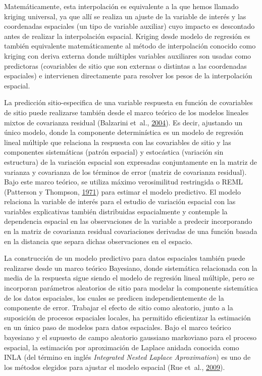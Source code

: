 \documentclass[11pt,b5paper,]{krantz}
\begin{document}
Matemáticamente, esta interpolación es equivalente a la que hemos
llamado kriging universal, ya que allí se realiza un ajuste de la
variable de interés y las coordenadas espaciales (un tipo de variable
auxiliar) cuyo impacto es descontado antes de realizar la interpolación
espacial. Kriging desde modelo de regresión es también equivalente
matemáticamente al método de interpolación conocido como kriging con
deriva externa donde múltiples variables auxiliares son usadas como
predictoras (covariables de sitio que son externas o distintas a las
coordenadas espaciales) e intervienen directamente para resolver los
pesos de la interpolación espacial.

La predicción sitio-especifica de una variable respuesta en función de
covariables de sitio puede realizarse también desde el marco teórico de
los modelos lineales mixtos de covarianza residual (Balzarini et~al.,
\protect\hyperlink{ref-Balzarini_Macchiavelli_Casanoves_2004}{2004}). Es
decir, ajustando un único modelo, donde la componente determinística es
un modelo de regresión lineal múltiple que relaciona la respuesta con
las covariables de sitio y las componentes sistemáticas (patrón
espacial) y estocástica (variación sin estructura) de la variación
espacial son expresadas conjuntamente en la matriz de varianza y
covarianza de los términos de error (matriz de covarianza residual).
Bajo este marco teórico, se utiliza máximo verosimilitud restringida o
REML (Patterson y Thompson,
\protect\hyperlink{ref-Patterson_Thompson_1971}{1971}) para estimar el
modelo predictivo. El modelo relaciona la variable de interés para el
estudio de variación espacial con las variables explicativas también
distribuidas espacialmente y contemple la dependencia espacial en las
observaciones de la variable a predecir incorporando en la matriz de
covarianza residual covariaciones derivadas de una función basada en la
distancia que separa dichas observaciones en el espacio.

La construcción de un modelo predictivo para datos espaciales también
puede realizarse desde un marco teórico Bayesiano, donde sistemática
relacionada con la media de la respuesta sigue siendo el modelo de
regresión lineal múltiple, pero se incorporan parámetros aleatorios de
sitio para modelar la componente sistemática de los datos espaciales,
los cuales se predicen independientemente de la componente de error.
Trabajar el efecto de sitio como aleatorio, junto a la suposición de
procesos espaciales locales, ha permitido eficientizar la estimación en
un único paso de modelos para datos espaciales. Bajo el marco teórico
bayesiano y el supuesto de campo aleatorio gaussiano markoviano para el
proceso espacial, la estimación por aproximación de Laplace anidada
conocida como INLA (del término en inglés \emph{Integrated Nested
Laplace Aproximation}) es uno de los métodos elegidos para ajustar el
modelo espacial (Rue et~al.,
\protect\hyperlink{ref-Rue_Martino_Chopin_2009}{2009}).
\end{document}
